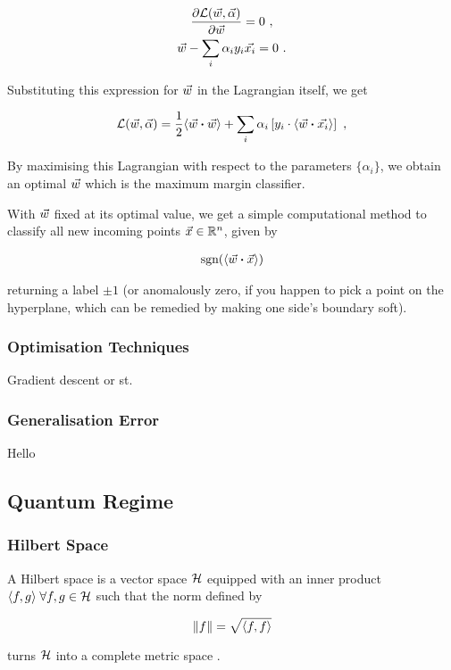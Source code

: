 \begin{gather}
    \frac{\partial \mathcal{L}(\vec{w}, \vec{\alpha})}{\partial \vec{w}} = 0~,\nonumber\\
    \vec{w} - \sum_i \alpha_i y_i \vec{x_i} = 0~.
\end{gather}

Substituting this expression for \(\vec{w}\) in the Lagrangian itself, we get

\begin{gather}
    \mathcal{L}(\vecw, \vec{\alpha}) = \frac{1}{2} \innerprod{\vecw}{\vecw} + \sum_i \alpha_i \left[y_i \cdot \innerprod{\vecw}{\vec{x_i}}\right]~,
\end{gather}

By maximising this Lagrangian with respect to the parameters \(\{\alpha_i\}\),
we obtain an optimal \(\vec{w}\) which is the maximum margin classifier.

With \(\vec{w}\) fixed at its optimal value, we get a simple computational method
to classify all new incoming points \(\vec{x} \in \mathbb{R}^n\), given by

\begin{gather}
    \text{sgn}(\innerprod{\vecw}{\vecx})
\end{gather}

returning a label \(\pm 1\) (or anomalously zero, if you happen to pick a point
on the hyperplane, which can be remedied by making one side's boundary soft).

\subsubsection{Optimisation Techniques}
Gradient descent or st. 

\subsubsection{Generalisation Error}
Hello 

\subsection{Quantum Regime}

\subsubsection{Hilbert Space}
\begin{definition}
    A Hilbert space is a vector space \(\mathcal{H}\) equipped with an inner
    product \(\langle f, g\rangle \;\forall f, g \in \mathcal{H}\) such that
    the norm defined by

    \begin{equation*}
        \norm{f} = \sqrt{\langle f, f\rangle}
    \end{equation*}

    turns \(\mathcal{H}\) into a complete metric space
    \cite{sansone1959orthogonal}.
\end{definition}

